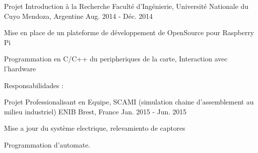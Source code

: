 

\begin{cventries}

  \cventry
    {Projet Introduction à la Recherche} %
    {Faculté d'Ingénierie, Université Nationale du Cuyo} %
    {Mendoza, Argentine} %
    {Aug. 2014 - Déc. 2014} %
    {
      \begin{cvitems} %
        \item {Mise en place de un plateforme de développement de OpenSource pour Raspberry Pi}
        \item {Programmation en C/C++ du peripheriques de la carte, Interaction avec l'hardware}
        \item {Responsabilidades : }
      \end{cvitems}
    }

  \cventry
    {Projet Professionalisant en Equipe, SCAMI (simulation chaine d'assemblement au milieu industriel)} %
    {ENIB} %
    {Brest, France} %
    {Jan. 2015 - Jun. 2015} %
    {
      \begin{cvitems} %
        \item {Mise a jour du système electrique, relevamiento de captores}
        \item {Programmation d'automate.}
      \end{cvitems}
    }


\end{cventries}
